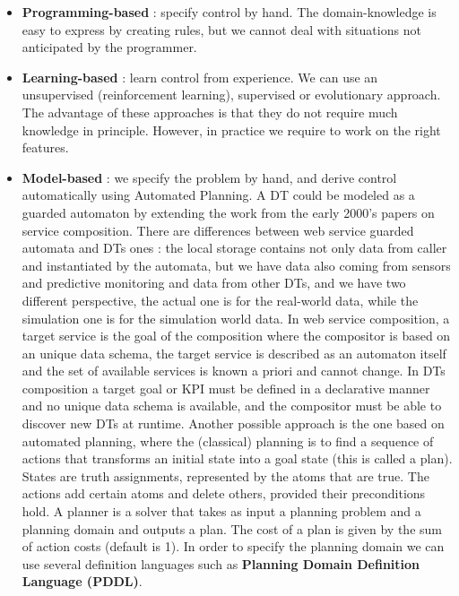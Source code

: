 \documentclass[11pt]{article}
\begin{document}
\begin{itemize}
\item \textbf{Programming-based} : specify control by hand. The domain-knowledge is easy to express by creating rules, but we cannot deal with situations not anticipated by the programmer.

\item \textbf{Learning-based} : learn control from experience. We can use an unsupervised (reinforcement learning), supervised or evolutionary approach. The advantage of these approaches is that they do not require much knowledge in principle. However, in practice we  require to work on the right features.

\item \textbf{Model-based} : we specify the problem by hand, and derive control automatically using Automated Planning. A DT could be modeled as a guarded automaton by extending the work from the early 2000's papers on service composition. There are differences between web service guarded automata and DTs ones : the local storage contains not only data from caller and instantiated by the automata, but we have data also coming from sensors and predictive monitoring and data from other DTs, and we have two different perspective, the actual one is for the real-world data, while the simulation one is for the simulation world data. In web service composition, a target service is the goal of the composition where the compositor is based on an unique data schema, the target service is described as an automaton itself and the set of available services is known a priori and cannot change. In DTs composition a target goal or KPI must be defined in a declarative manner and no unique data schema is available, and the compositor must be able to discover new DTs at runtime. Another possible approach is the one based on automated planning, where the (classical) planning is to find a sequence of actions that  transforms an initial state into a goal state (this is called a plan). States are truth assignments, represented by the atoms that are true. The actions add certain atoms and delete others, provided their preconditions hold. A planner is a solver that takes as input a planning problem and a planning domain and outputs a plan. The cost of a plan is given by the sum of action costs (default is 1). In order to specify the planning domain we can use several definition languages such as \textbf{Planning Domain Definition Language (PDDL)}. 
\end{itemize}
\end{document}
